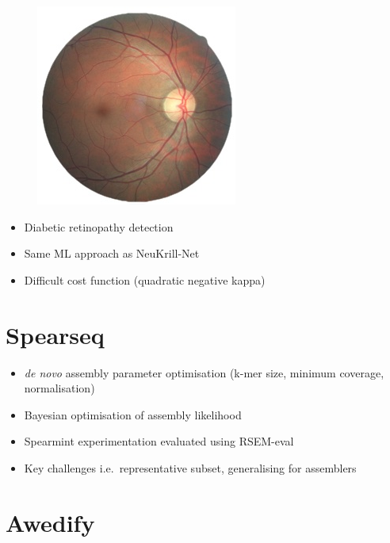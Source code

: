 \documentclass[ignorenonframetext,]{beamer}
\begin{document}
\begin{frame}

\begin{figure}[htbp]
\centering
\includegraphics{assets/presentation/GIML/retina.jpg}
\caption{}
\end{figure}

\begin{itemize}
\itemsep1pt\parskip0pt
\item
  Diabetic retinopathy detection
\item
  Same ML approach as NeuKrill-Net
\item
  Difficult cost function (quadratic negative kappa)
\end{itemize}

\end{frame}

\section{Spearseq}\label{spearseq}

\begin{frame}

\begin{itemize}
\itemsep1pt\parskip0pt
\item
  \emph{de novo} assembly parameter optimisation (k-mer size, minimum
  coverage, normalisation)
\item
  Bayesian optimisation of assembly likelihood
\item
  Spearmint experimentation evaluated using RSEM-eval
\item
  Key challenges i.e.~representative subset, generalising for assemblers
\end{itemize}

\end{frame}

\section{Awedify}\label{awedify}
\end{document}
